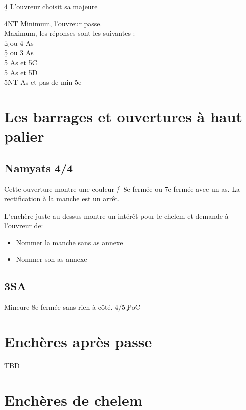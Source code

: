 \documentclass[a4paper]{article}
\begin{document}
\begin{bidtable}
4\d \> L'ouvreur choisit sa majeure
\end{bidtable}

\begin{bidtable}
4NT \> Minimum, l'ouvreur passe.\\
\>Maximum, les réponses sont les suivantes :\+\\
5\c {} ou 4 As\\
5\d {} ou 3 As\\
5\h {} As et 5C\\
5\s {} As et 5D\\
5NT  As et pas de min 5e\-
\end{bidtable}

\section{Les barrages et ouvertures à haut palier}

\subsection{Namyats 4\pdfc/4\pdfd}

Cette ouverture montre une couleur \h /\s\ 8e fermée ou 7e fermée avec un as.
La rectification à la manche est un arrêt.

L'enchère juste au-dessus montre un intérêt pour le chelem et demande à l'ouvreur de:

\begin{itemize}
\item Nommer la manche sans as annexe

\item Nommer son as annexe

\end{itemize}

\subsection{3SA}

Mineure 8e fermée sans rien à côté. 
4/5\c \d\ PoC

\section{Enchères après passe}

TBD

\section{Enchères de chelem}
\end{document}
